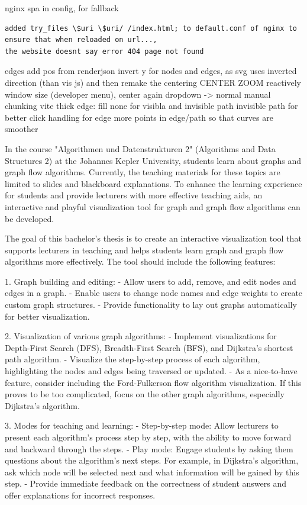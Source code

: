 \documentclass[options]{article}
\begin{document}
nginx spa in config, for fallback
\begin{verbatim}
added try_files \$uri \$uri/ /index.html; to default.conf of nginx to ensure that when reloaded on url..., 
the website doesnt say error 404 page not found
\end{verbatim}

edges add pos from renderjson
invert y for nodes and edges, as svg uses inverted direction (than vis js) and then remake the centering
CENTER ZOOM reactively
window size (developer menu), center again
dropdown -> normal
manual chunking vite
thick edge: fill none for visibla and invisible path
invisible path for better click handling for edge
more points in edge/path so that curves are smoother


In the course "Algorithmen und Datenstrukturen 2" (Algorithms and Data Structures 2) at the Johannes Kepler University,
students learn about graphs and graph flow algorithms. Currently, the teaching materials for these topics are limited to
slides and blackboard explanations. To enhance the learning experience for students and provide lecturers with more effective
teaching aids, an interactive and playful visualization tool for graph and graph flow algorithms can be developed.

The goal of this bachelor's thesis is to create an interactive visualization tool that supports lecturers in teaching and
helps students learn graph and graph flow algorithms more effectively. The tool should include the following features:

1. Graph building and editing:
   - Allow users to add, remove, and edit nodes and edges in a graph.
   - Enable users to change node names and edge weights to create custom graph structures.
   - Provide functionality to lay out graphs automatically for better visualization.

2. Visualization of various graph algorithms:
   - Implement visualizations for Depth-First Search (DFS), Breadth-First Search (BFS), and Dijkstra's shortest path algorithm.
   - Visualize the step-by-step process of each algorithm, highlighting the nodes and edges being traversed or updated.
   - As a nice-to-have feature, consider including the Ford-Fulkerson flow algorithm visualization. If this proves to be too
   complicated, focus on the other graph algorithms, especially Dijkstra's algorithm.

3. Modes for teaching and learning:
   - Step-by-step mode: Allow lecturers to present each algorithm's process step by step, with the ability to move forward and backward through the steps.
   - Play mode: Engage students by asking them questions about the algorithm's next steps. For example, in Dijkstra's algorithm,
   ask which node will be selected next and what information will be gained by this step.
   - Provide immediate feedback on the correctness of student answers and offer explanations for incorrect responses.
\end{document}
